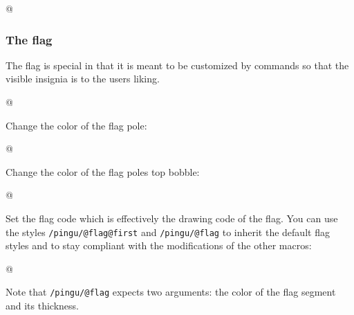 \documentclass[parskip=half,english,numbers=noenddot,footnotes=nomultiple,oneside]{scrartcl}
\def\lpingu#1{\lstinline[style=lstpingu,language=pingulang]'#1'}
\begin{document}
\begin{tcblisting}{@}
\begin{tikzpicture}
	\pingu[broom right, broom right bristles c=pingu@green]
\end{tikzpicture}
\end{tcblisting}
\endsubkeyexplain

\subsubsection{The flag}
The flag is special in that it is meant to be customized by commands so that the visible insignia is to the users liking.

\begin{tcblisting}{@}
\begin{tikzpicture}
	\pingu[flag left=green]
\end{tikzpicture}
\end{tcblisting}
\endshowkeyexplain

Change the color of the flag pole:
	\begin{tcblisting}{@}
\begin{tikzpicture}
	\pingu[flag left, flag left pole=green]
\end{tikzpicture}
\end{tcblisting}
\endsubkeyexplain

Change the color of the flag poles top bobble:
	\begin{tcblisting}{@}
\begin{tikzpicture}
	\pingu[flag left, flag left bobble=green]
\end{tikzpicture}
\end{tcblisting}
\endsubkeyexplain

Set the flag code which is effectively the drawing code of the flag.
You can use the styles \lpingu{/pingu/@flag@first} and \lpingu{/pingu/@flag} to inherit the default flag styles and to stay compliant with the modifications of the other macros:
	\begin{tcblisting}{@}
\begin{tikzpicture}
	\pingu[flag left, flag left code={
	  \node[/pingu/@flag@first,
	  	/pingu/@flag={blue}{5mm}]
	  		(upper) at (0,0) {};
	  \node[below,/pingu/@flag={black}{4mm}]
	  	(lower) at (upper.south) {};
	}]
\end{tikzpicture}
\end{tcblisting}
Note that \lpingu{/pingu/@flag} expects two arguments: the color of the flag segment and its thickness.
\endsubkeyexplain
\end{document}
